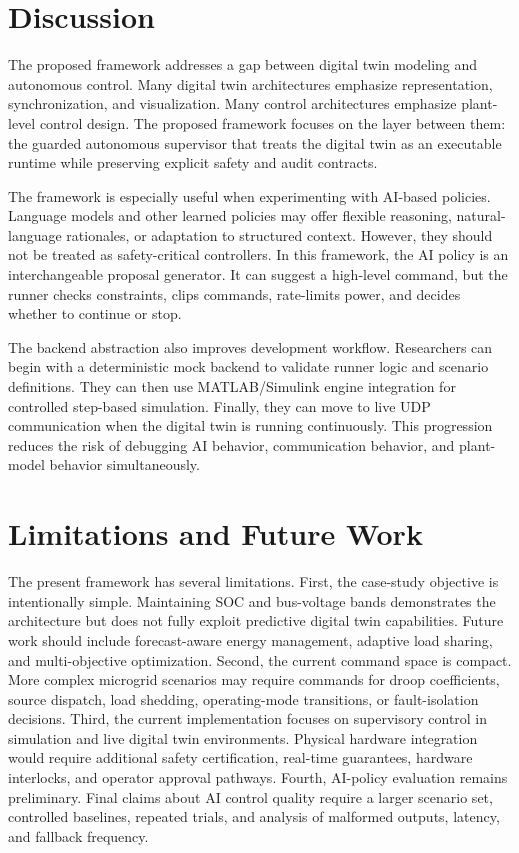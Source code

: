 \documentclass[conference]{IEEEtran}
\begin{document}
\section{Discussion}

The proposed framework addresses a gap between digital twin modeling and
autonomous control. Many digital twin architectures emphasize representation,
synchronization, and visualization. Many control architectures emphasize
plant-level control design. The proposed framework focuses on the layer
between them: the guarded autonomous supervisor that treats the digital twin
as an executable runtime while preserving explicit safety and audit contracts.

The framework is especially useful when experimenting with AI-based policies.
Language models and other learned policies may offer flexible reasoning,
natural-language rationales, or adaptation to structured context. However,
they should not be treated as safety-critical controllers. In this framework,
the AI policy is an interchangeable proposal generator. It can suggest a
high-level command, but the runner checks constraints, clips commands,
rate-limits power, and decides whether to continue or stop.

The backend abstraction also improves development workflow. Researchers can
begin with a deterministic mock backend to validate runner logic and scenario
definitions. They can then use MATLAB/Simulink engine integration for
controlled step-based simulation. Finally, they can move to live UDP
communication when the digital twin is running continuously. This progression
reduces the risk of debugging AI behavior, communication behavior, and
plant-model behavior simultaneously.

\section{Limitations and Future Work}

The present framework has several limitations. First, the case-study objective
is intentionally simple. Maintaining SOC and bus-voltage bands demonstrates
the architecture but does not fully exploit predictive digital twin
capabilities. Future work should include forecast-aware energy management,
adaptive load sharing, and multi-objective optimization. Second, the current
command space is compact. More complex microgrid scenarios may require
commands for droop coefficients, source dispatch, load shedding,
operating-mode transitions, or fault-isolation decisions. Third, the current
implementation focuses on supervisory control in simulation and live digital
twin environments. Physical hardware integration would require additional
safety certification, real-time guarantees, hardware interlocks, and operator
approval pathways. Fourth, AI-policy evaluation remains preliminary. Final
claims about AI control quality require a larger scenario set, controlled
baselines, repeated trials, and analysis of malformed outputs, latency, and
fallback frequency.
\end{document}
